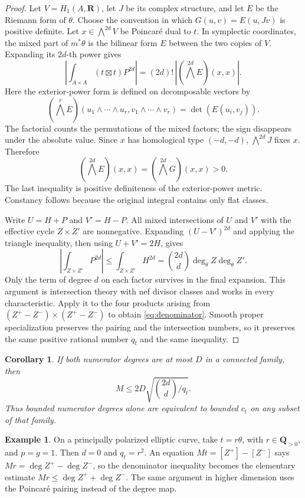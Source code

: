 \documentclass[11pt]{article}
\newtheorem{corollary}[theorem]{Corollary}
\theoremstyle{definition}
\newtheorem{example}[theorem]{Example}
\theoremstyle{remark}
\newcommand{\Q}{\mathbf Q}
\newcommand{\R}{\mathbf R}
\begin{document}
\begin{proof}
Let $V=H_1(A,\R)$, let $J$ be its complex structure, and let $E$ be the Riemann form of $\theta$. Choose the convention in which $G(u,v)=E(u,Jv)$ is positive definite. Let $x\in\bigwedge^{2d}V$ be Poincar\'e dual to $t$. In symplectic coordinates, the mixed part of $m^*\theta$ is the bilinear form $E$ between the two copies of $V$. Expanding its $2d$-th power gives
\[
 \left|\int_{A\times A}(t\boxtimes t)P^{2d}\right|
 =(2d)!\,\left|(\bigwedge^{2d}E)(x,x)\right|.
\]
Here the exterior-power form is defined on decomposable vectors by
\[
 (\bigwedge^r E)(u_1\wedge\cdots\wedge u_r,
 v_1\wedge\cdots\wedge v_r)=\det(E(u_i,v_j)).
\]
The factorial counts the permutations of the mixed factors; the sign disappears under the absolute value. Since $x$ has homological type $(-d,-d)$, $\bigwedge^{2d}J$ fixes $x$. Therefore
\[
 (\bigwedge^{2d}E)(x,x)
 =(\bigwedge^{2d}G)(x,x)>0.
\]
The last inequality is positive definiteness of the exterior-power metric. Constancy follows because the original integral contains only flat classes.

Write $U=H+P$ and $V'=H-P$. All mixed intersections of $U$ and $V'$ with the effective cycle $Z\times Z'$ are nonnegative. Expanding $(U-V')^{2d}$ and applying the triangle inequality, then using $U+V'=2H$, gives
\[
 \left|\int_{Z\times Z'}P^{2d}\right|
 \leq\int_{Z\times Z'}H^{2d}
 =\binom{2d}{d}\deg_\theta Z\deg_\theta Z'.
\]
Only the term of degree $d$ on each factor survives in the final expansion. This argument is intersection theory with nef divisor classes and works in every characteristic. Apply it to the four products arising from $(Z^+-Z^-)\times(Z^+-Z^-)$ to obtain \eqref{eq:denominator}. Smooth proper specialization preserves the pairing and the intersection numbers, so it preserves the same positive rational number $q_t$ and the same inequality.
\end{proof}

\begin{corollary}\label{cor:denominator}
If both numerator degrees are at most $D$ in a connected family, then
\[
 M\leq 2D\sqrt{\binom{2d}{d}/q_t}.
\]
Thus bounded numerator degrees alone are equivalent to bounded $c_t$ on any subset of that family.
\end{corollary}

\begin{example}
On a principally polarized elliptic curve, take $t=r\theta$, with $r\in\Q_{>0}$, and $p=g=1$. Then $d=0$ and $q_t=r^2$. An equation $Mt=[Z^+]-[Z^-]$ says $Mr=\deg Z^+-\deg Z^-$, so the denominator inequality becomes the elementary estimate $Mr\leq\deg Z^++\deg Z^-$. The same argument in higher dimension uses the Poincar\'e pairing instead of the degree map.
\end{example}
\end{document}
